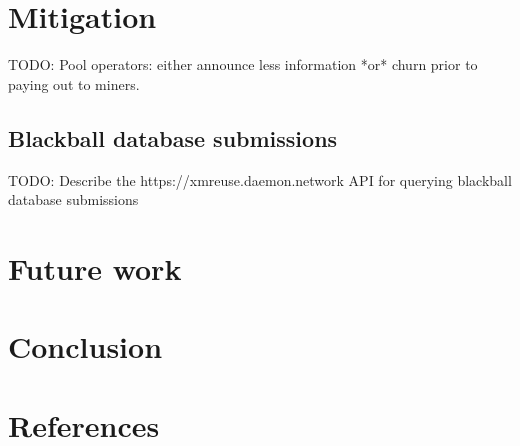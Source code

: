 \documentclass[notitlepage]{report}
\begin{document}
\section{Mitigation}

TODO: Pool operators: either announce less information *or* churn prior to paying out to miners.

\subsection{Blackball database submissions}

TODO: Describe the https://xmreuse.daemon.network API for querying blackball database submissions

\section{Future work}

\section{Conclusion}

\section{References}
\end{document}
